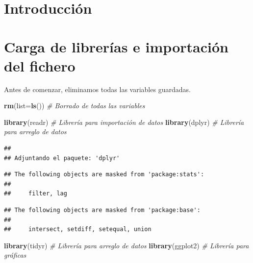 \documentclass[notspecified,article,submit,moreauthors,pdftex]{Definitions/mdpi}
\newenvironment{Shaded}{\begin{snugshade}}{\end{snugshade}}
\newcommand{\AttributeTok}[1]{\textcolor[rgb]{0.13,0.29,0.53}{#1}}
\newcommand{\CommentTok}[1]{\textcolor[rgb]{0.56,0.35,0.01}{\textit{#1}}}
\newcommand{\FunctionTok}[1]{\textcolor[rgb]{0.13,0.29,0.53}{\textbf{#1}}}
\newcommand{\NormalTok}[1]{#1}
\begin{document}

\section{Introducción}\label{introducciuxf3n}

\section{Carga de librerías e importación del
fichero}\label{carga-de-libreruxedas-e-importaciuxf3n-del-fichero}

Antes de comenzar, eliminamos todas las variables guardadas.

\begin{Shaded}
\begin{Highlighting}[]
\FunctionTok{rm}\NormalTok{(}\AttributeTok{list=}\FunctionTok{ls}\NormalTok{())  }\CommentTok{\# Borrado de todas las variables}
\end{Highlighting}
\end{Shaded}

\begin{Shaded}
\begin{Highlighting}[]
\FunctionTok{library}\NormalTok{(readr)  }\CommentTok{\# Librería para importación de datos}
\FunctionTok{library}\NormalTok{(dplyr) }\CommentTok{\# Librería para arreglo de datos}
\end{Highlighting}
\end{Shaded}

\begin{verbatim}
## 
## Adjuntando el paquete: 'dplyr'
\end{verbatim}

\begin{verbatim}
## The following objects are masked from 'package:stats':
## 
##     filter, lag
\end{verbatim}

\begin{verbatim}
## The following objects are masked from 'package:base':
## 
##     intersect, setdiff, setequal, union
\end{verbatim}

\begin{Shaded}
\begin{Highlighting}[]
\FunctionTok{library}\NormalTok{(tidyr) }\CommentTok{\# Librería para arreglo de datos}
\FunctionTok{library}\NormalTok{(ggplot2) }\CommentTok{\# Librería para gráficas}
\end{Highlighting}
\end{Shaded}
\end{document}
